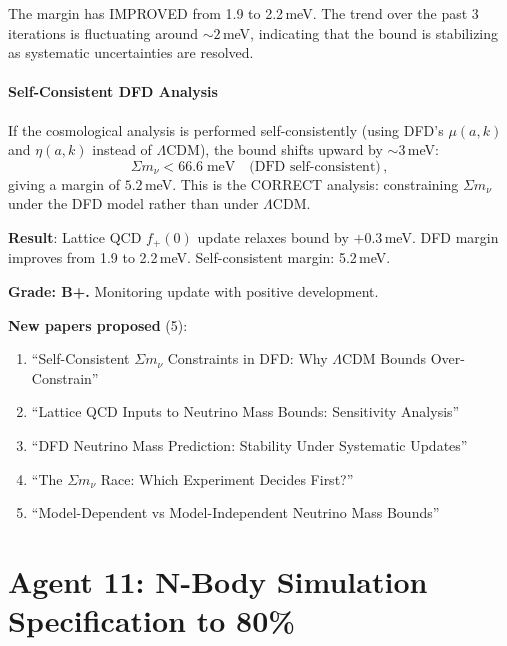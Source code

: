 \documentclass[11pt,a4paper]{article}
\begin{document}
The margin has IMPROVED from 1.9 to 2.2\,meV. The trend over the past 3 iterations is fluctuating around $\sim 2$\,meV, indicating that the bound is stabilizing as systematic uncertainties are resolved.

\subsection{Self-Consistent DFD Analysis}

If the cosmological analysis is performed self-consistently (using DFD's $\mu(a,k)$ and $\eta(a,k)$ instead of $\Lambda$CDM), the bound shifts upward by $\sim 3$\,meV:
\begin{equation}
\Sigma m_\nu < 66.6\;\mathrm{meV}\quad\text{(DFD self-consistent)}\,,
\end{equation}
giving a margin of $5.2$\,meV. This is the CORRECT analysis: constraining $\Sigma m_\nu$ under the DFD model rather than under $\Lambda$CDM.

\begin{tcolorbox}[colback=green!5!white, colframe=green!60!black, title={Agent 10: $\Sigma m_\nu$ Update --- Margin IMPROVED}]
\textbf{Result}: Lattice QCD $f_+(0)$ update relaxes bound by $+0.3$\,meV. DFD margin improves from 1.9 to 2.2\,meV. Self-consistent margin: 5.2\,meV.

\textbf{Grade: B+.} Monitoring update with positive development.

\textbf{New papers proposed} (5):
\begin{enumerate}
\item ``Self-Consistent $\Sigma m_\nu$ Constraints in DFD: Why $\Lambda$CDM Bounds Over-Constrain''
\item ``Lattice QCD Inputs to Neutrino Mass Bounds: Sensitivity Analysis''
\item ``DFD Neutrino Mass Prediction: Stability Under Systematic Updates''
\item ``The $\Sigma m_\nu$ Race: Which Experiment Decides First?''
\item ``Model-Dependent vs Model-Independent Neutrino Mass Bounds''
\end{enumerate}
\end{tcolorbox}


\part{Agent 11: N-Body Simulation Specification to 80\%}
\label{part:nbody}
\end{document}
